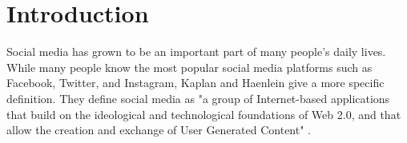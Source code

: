 \chapter{Introduction}
\label{cha:Chapter1_Introduction}

\iffalse

Total length: up to 5 Months = ~20 weeks oder
\selectlanguage{german}{

Abstract fertig machen, konkreter werden --> vor allem Methoden, kleiner Ansatz


Length: 1-2 pages
Inhaltsverzeichnis --> auch mehr Punkte

Methodology and Implementation --> kann man auch anders aufteilen
Motivation, Hintergrund

Warum diese Plattform --> einfache API

Auch aufpassen illegal

Wann schreiben? --> am Anfang, am Ende? Erstmal Entwurf am Ende
}
\selectlanguage{english}
%
%

\fi


Social media has grown to be an important part of many people's daily lives. While many people know the most popular social media platforms such as Facebook, Twitter, and Instagram, Kaplan and Haenlein give a more specific definition. They define social media as "a group of Internet-based applications that build on the ideological and technological foundations of Web 2.0, and that allow the creation and exchange of User Generated Content" \cite[p.~61]{KAPLAN201059}. 

